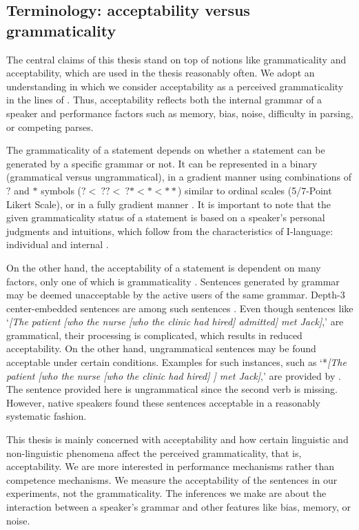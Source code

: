 \subsection{Terminology: acceptability versus grammaticality}

The central claims of this thesis stand on top of notions like grammaticality and acceptability, which are used in the thesis reasonably often. We adopt an understanding in which we consider acceptability as a perceived grammaticality in the lines of . Thus, acceptability reflects both the internal grammar of a speaker and performance factors such as memory, bias, noise, difficulty in parsing, or competing parses.

The grammaticality of a statement depends on whether a statement can be generated by a specific grammar or not. It can be represented in a binary (grammatical versus ungrammatical), in a gradient manner using combinations of $?$ and $\ast$ symbols ($?<{\ }??<{\ }?\ast<\ast<\ast\ast$) similar to ordinal scales (5/7-Point Likert Scale), or in a fully gradient manner \citep{Keller2000}. It is important to note that the given grammaticality status of a statement is based on a speaker's personal judgments and intuitions, which follow from the characteristics of I-language: individual and internal \citep{C86}.

On the other hand, the acceptability of a statement is dependent on many factors, only one of which is grammaticality \citep{C65}. Sentences generated by grammar may be deemed unacceptable by the active users of the same grammar. Depth-3 center-embedded sentences are among such sentences \citep{GibsonThomas99}. Even though sentences like `\emph{[The patient [who the nurse [who the clinic had hired] admitted] met Jack]},' are grammatical, their processing is complicated, which results in reduced acceptability. On the other hand, ungrammatical sentences may be found acceptable under certain conditions. Examples for such instances, such as `*\emph{[The patient [who the nurse [who the clinic had hired] ] met Jack]},' are provided by \citep{GibsonThomas99}. The sentence provided here is ungrammatical since the second verb is missing. However, native speakers found these sentences acceptable in a reasonably systematic fashion. 

This thesis is mainly concerned with acceptability and how certain linguistic and non-linguistic phenomena affect the perceived grammaticality, that is, acceptability. We are more interested in performance mechanisms rather than competence mechanisms. We measure the acceptability of the sentences in our experiments, not the grammaticality. The inferences we make are about the interaction between a speaker's grammar and other features like bias, memory, or noise.

